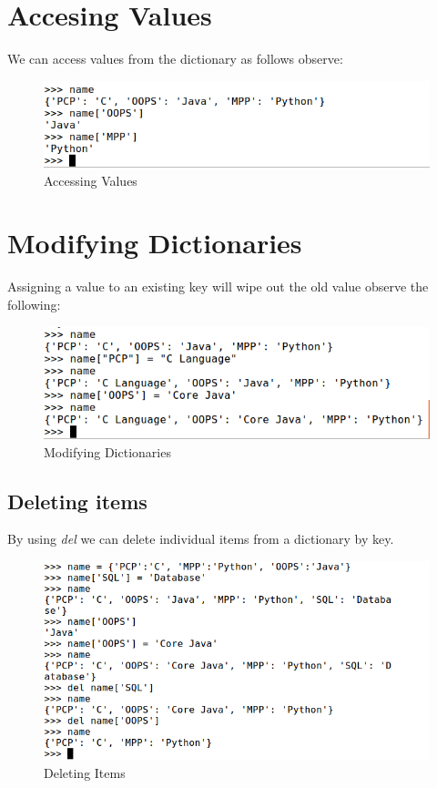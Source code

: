 \documentclass[11pt,a4paper]{article}
\begin{document}
\section*{Accesing Values}
We can access values from the dictionary as follows observe:
\begin{figure}[ht]
\begin{center}
\includegraphics[scale=0.5]{Accessing_Values.png}
\caption{Accessing Values}
\label{Accessing Values}
\end{center}
\end{figure}

\section*{Modifying Dictionaries}
Assigning a value to an existing key  will wipe out the old value observe the following:
\begin{figure}[ht]
\begin{center}
\includegraphics[scale=0.5]{Modifying_Dictionaries.png}
\caption{Modifying Dictionaries}
\label{Modifying_Dictionaries}
\end{center}
\end{figure}

\subsection*{Deleting items}
By using \emph{del} we can delete individual items from a dictionary by key.
\begin{figure}[ht]
\begin{center}
\includegraphics[scale=0.5]{Deleting_items.png}
\caption{Deleting Items}
\label{Deleting Items}
\end{center}
\end{figure}
\end{document}
